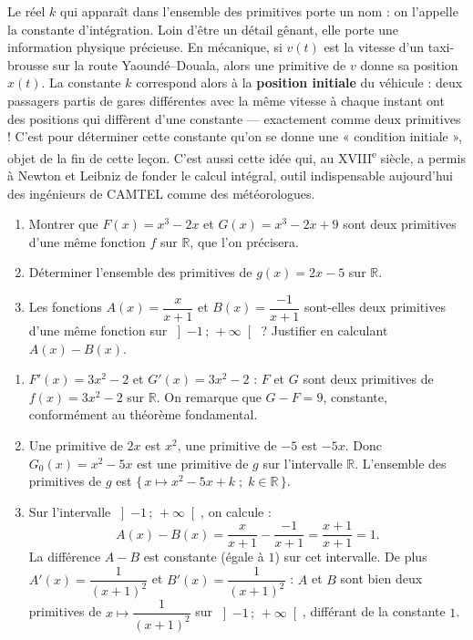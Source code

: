 \documentclass[11pt]{article}
\newcommand{\cle}[1]{{\popxbold\color{popdark}#1}}
\begin{document}
\begin{savaistu}
Le réel $k$ qui apparaît dans l'ensemble des primitives porte un nom : on l'appelle la \cle{constante d'intégration}. Loin d'être un détail gênant, elle porte une information physique précieuse. En mécanique, si $v(t)$ est la vitesse d'un taxi-brousse sur la route Yaoundé--Douala, alors une primitive de $v$ donne sa position $x(t)$. La constante $k$ correspond alors à la \textbf{position initiale} du véhicule : deux passagers partis de gares différentes avec la même vitesse à chaque instant ont des positions qui diffèrent d'une constante — exactement comme deux primitives ! C'est pour déterminer cette constante qu'on se donne une « condition initiale », objet de la fin de cette leçon. C'est aussi cette idée qui, au XVIII\textsuperscript{e} siècle, a permis à Newton et Leibniz de fonder le calcul intégral, outil indispensable aujourd'hui des ingénieurs de CAMTEL comme des météorologues.
\end{savaistu}

\begin{exercice}
\begin{enumerate}
\item Montrer que $F(x) = x^3 - 2x$ et $G(x) = x^3 - 2x + 9$ sont deux primitives d'une même fonction $f$ sur $\mathbb{R}$, que l'on précisera.
\item Déterminer l'ensemble des primitives de $g(x) = 2x - 5$ sur $\mathbb{R}$.
\item Les fonctions $A(x) = \dfrac{x}{x+1}$ et $B(x) = \dfrac{-1}{x+1}$ sont-elles deux primitives d'une même fonction sur $\left]-1\,;\,+\infty\right[$ ? Justifier en calculant $A(x) - B(x)$.
\end{enumerate}
\end{exercice}

\begin{corrige}[Exercice]
\begin{enumerate}
\item $F'(x) = 3x^2 - 2$ et $G'(x) = 3x^2 - 2$ : $F$ et $G$ sont deux primitives de $f(x) = 3x^2 - 2$ sur $\mathbb{R}$. On remarque que $G - F = 9$, constante, conformément au théorème fondamental.
\item Une primitive de $2x$ est $x^2$, une primitive de $-5$ est $-5x$. Donc $G_0(x) = x^2 - 5x$ est une primitive de $g$ sur l'intervalle $\mathbb{R}$. L'ensemble des primitives de $g$ est $\{\, x \longmapsto x^2 - 5x + k \; ; \; k \in \mathbb{R} \,\}$.
\item Sur l'intervalle $\left]-1\,;\,+\infty\right[$, on calcule :
\[ A(x) - B(x) = \frac{x}{x+1} - \frac{-1}{x+1} = \frac{x+1}{x+1} = 1. \]
La différence $A - B$ est constante (égale à $1$) sur cet intervalle. De plus $A'(x) = \dfrac{1}{(x+1)^2}$ et $B'(x) = \dfrac{1}{(x+1)^2}$ : $A$ et $B$ sont bien deux primitives de $x \longmapsto \dfrac{1}{(x+1)^2}$ sur $\left]-1\,;\,+\infty\right[$, différant de la constante $1$.
\end{enumerate}
\end{corrige}
\end{document}
